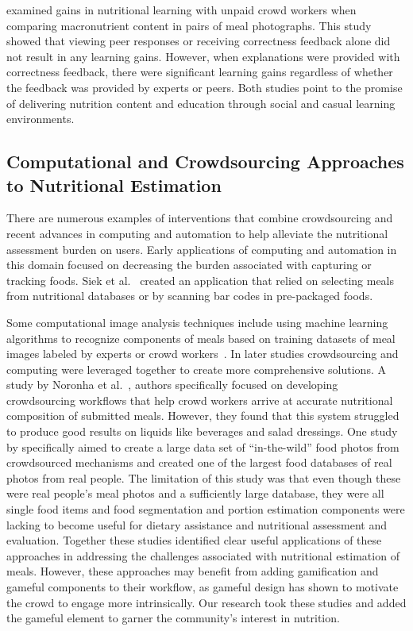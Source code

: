 \cite{burgermaster2017role} examined gains in nutritional learning with unpaid crowd workers when comparing macronutrient content in pairs of meal photographs. This study showed that viewing peer responses or receiving correctness feedback alone did not result in any learning gains. However, when explanations were provided with correctness feedback, there were significant learning gains regardless of whether the feedback was provided by experts or peers. Both studies point to the promise of delivering nutrition content and education through social and casual learning environments. 

 
\vspace{-5pt}
\subsection{Computational and Crowdsourcing Approaches to Nutritional Estimation}

There are numerous examples of  interventions that combine crowdsourcing and recent advances in computing and automation to help alleviate the nutritional assessment burden on users. 
Early applications of computing and automation in this domain focused on decreasing the burden associated with capturing or tracking foods. Siek et al.~\cite{siek2006we} created an application that relied on selecting meals from nutritional databases or by scanning bar codes in pre-packaged foods. 

Some computational image analysis techniques include using machine learning algorithms to recognize components of meals based on training datasets of meal images labeled by experts or crowd workers~\cite{anthimopoulos2015computer,pouladzadeh2016food,rhyner2016carbohydrate,Thomaz:2013:FIE:2526667.2526672}. 
In later studies crowdsourcing and computing were leveraged together to create more comprehensive solutions. A study by Noronha et al.~\cite{noronha2011platemate}, authors specifically focused on developing crowdsourcing workflows that help crowd workers arrive at accurate nutritional composition of submitted meals. However, they found that this system struggled to produce good results on liquids like beverages and salad dressings. One study by \cite{merler2016snap} specifically aimed to create a large data set of ``in-the-wild'' food photos from crowdsourced mechanisms and created one of the largest food databases of real photos from real people. The limitation of this study was that even though these were real people's meal photos and a sufficiently large database, they were all single food items and food segmentation and portion estimation components were lacking to become useful for dietary assistance and nutritional assessment and evaluation. Together these studies identified clear useful applications of these approaches in addressing the challenges associated with nutritional estimation of meals. However, these approaches may benefit from adding gamification and gameful components to their workflow, as gameful design has shown to motivate the crowd to engage more intrinsically. Our research took these studies and added the gameful element to garner the community's interest in nutrition. 



